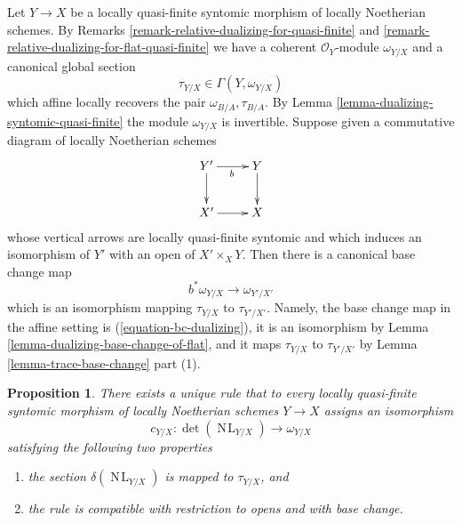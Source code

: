 \documentclass{stacks-project}
\theoremstyle{plain}
\newtheorem{proposition}[subsection]{Proposition}
\theoremstyle{definition}
\theoremstyle{remark}
\numberwithin{equation}{subsection}
\def\NL{\mathop{N\!L}\nolimits}
\begin{document}
\noindent
Let $Y \to X$ be a locally quasi-finite syntomic morphism of
locally Noetherian schemes. By
Remarks \ref{remark-relative-dualizing-for-quasi-finite} and
\ref{remark-relative-dualizing-for-flat-quasi-finite} we have
a coherent $\mathcal{O}_Y$-module $\omega_{Y/X}$ and a canonical
global section
$$
\tau_{Y/X} \in \Gamma(Y, \omega_{Y/X})
$$
which affine locally recovers the pair $\omega_{B/A}, \tau_{B/A}$.
By Lemma \ref{lemma-dualizing-syntomic-quasi-finite} the module
$\omega_{Y/X}$ is invertible. Suppose given a commutative diagram of
locally Noetherian schemes
$$
\xymatrix{
Y' \ar[r]_b \ar[d] & Y \ar[d] \\
X' \ar[r] & X
}
$$
whose vertical arrows are locally quasi-finite syntomic and which
induces an isomorphism of $Y'$ with an open of $X' \times_X Y$.
Then there is a canonical base change map
$$
b^*\omega_{Y/X} \longrightarrow \omega_{Y'/X'}
$$
which is an isomorphism
mapping $\tau_{Y/X}$ to $\tau_{Y'/X'}$. Namely, the base change map
in the affine setting is (\ref{equation-bc-dualizing}), it is an
isomorphism by Lemma \ref{lemma-dualizing-base-change-of-flat}, and it
maps $\tau_{Y/X}$ to $\tau_{Y'/X'}$ by
Lemma \ref{lemma-trace-base-change} part (1).

\begin{proposition}
\label{proposition-tate-map}
There exists a unique rule that to every locally quasi-finite syntomic
morphism of locally Noetherian schemes $Y \to X$ assigns an isomorphism
$$
c_{Y/X} : \det(\NL_{Y/X}) \longrightarrow \omega_{Y/X}
$$
satisfying the following two properties
\begin{enumerate}
\item the section $\delta(\NL_{Y/X})$ is mapped to $\tau_{Y/X}$, and
\item the rule is compatible with restriction to opens and with
base change.
\end{enumerate}
\end{proposition}
\end{document}
